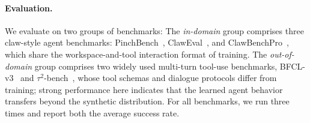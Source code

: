 \documentclass[letterpaper]{article} %
\begin{document}
\paragraph{Evaluation.} 
We evaluate on two groups of benchmarks:
The \emph{in-domain} group comprises three claw-style agent benchmarks: 
PinchBench~\citep{kiloaiteam2026pinchbench}, ClawEval~\citep{ye2026claw}, and ClawBenchPro~\citep{clawbenchpro}, which share the workspace-and-tool interaction format of training.
The \emph{out-of-domain} group comprises two widely used multi-turn tool-use benchmarks, BFCL-v3~\citep{patil2025bfcl} and $\tau^2$-bench~\citep{barres2025tau2}, whose tool schemas and dialogue protocols differ from training; strong performance here indicates that the learned agent behavior transfers beyond the synthetic distribution.
For all benchmarks, we run three times and report both the average success rate.
\end{document}
